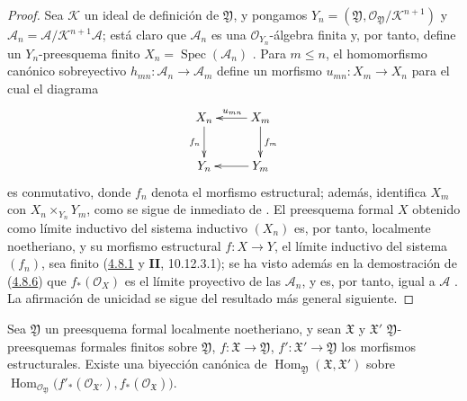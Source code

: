 \begin{proof}
Sea $\mathcal K$ un ideal de definición de $\mathfrak Y$, y pongamos
$Y_n=(\mathfrak Y,\mathcal O_{\mathfrak Y}/\mathcal K^{n+1})$ y
$\mathcal A_n=\mathcal A/\mathcal K^{n+1}\mathcal A$;
está claro que $\mathcal A_n$ es una $\mathcal O_{Y_n}$-álgebra finita y, por tanto,
define un $Y_n$-preesquema finito
$X_n=\operatorname{Spec}(\mathcal A_n)$
. Para $m\leq n$, el homomorfismo canónico
sobreyectivo
$h_{mn}:\mathcal A_n\to\mathcal A_m$
define un morfismo $u_{mn}:X_m\to X_n$ para el cual el diagrama
\[
\xymatrix{
X_n\ar[d]_{f_n} & X_m\ar[l]_{u_{mn}}\ar[d]^{f_m}\\
Y_n & Y_m\ar[l]
}
\]
es conmutativo, donde $f_n$ denota el morfismo estructural; además,
identifica $X_m$ con
$X_n\times_{Y_n}Y_m$, como se sigue de inmediato de
. El preesquema formal $X$ obtenido
como límite inductivo del sistema inductivo $(X_n)$ es, por tanto,
localmente noetheriano, y su morfismo estructural
$f:X\to Y$,
el límite inductivo del sistema $(f_n)$, sea finito (\hyperref[III.4.8.1-fr]{4.8.1} y \textbf{II}, 10.12.3.1); se ha visto además en la demostración de (\hyperref[III.4.8.6-fr]{4.8.6}) que $f_*(\mathcal O_X)$ es el límite proyectivo de las
$\mathcal A_n$, y es, por tanto, igual a $\mathcal A$
. La afirmación de unicidad se sigue del
resultado más general siguiente.
\end{proof}

\begin{proposition}[4.8.8]
\label{III.4.8.8}
\label{III.4.8.8-fr}
Sea $\mathfrak Y$ un preesquema formal localmente noetheriano, y
sean $\mathfrak X$ y $\mathfrak X'$
$\mathfrak Y$-preesquemas formales finitos sobre $\mathfrak Y$, $f:\mathfrak X\to\mathfrak Y$,
$f':\mathfrak X'\to\mathfrak Y$ los morfismos estructurales. Existe una
biyección canónica de
$\operatorname{Hom}_{\mathfrak Y}(\mathfrak X,\mathfrak X')$
sobre
$\operatorname{Hom}_{\mathcal O_{\mathfrak Y}}
\bigl(f'_*(\mathcal O_{\mathfrak X'}),f_*(\mathcal O_{\mathfrak X})\bigr)$\footnotemark.
\end{proposition}

